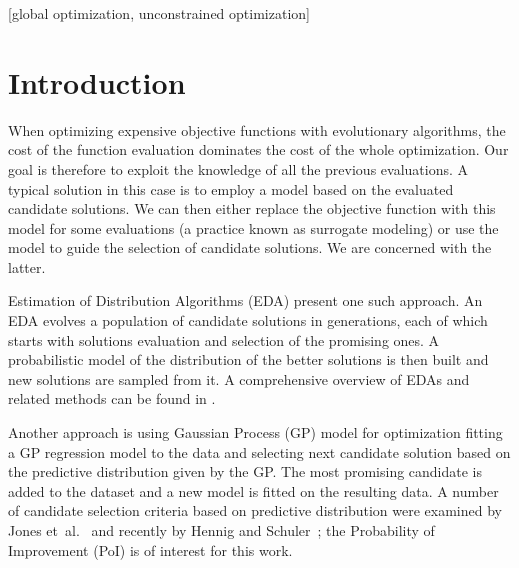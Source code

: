 \documentclass{sig-alternate}
\begin{document}
\maketitle
\begin{abstract}
Model Guided Sampling Optimization (MGSO) is a novel expensive black-box
optimization method based on a combination of ideas from Estimation of 
Distribution Algorithms and global optimization methods using Gaussian 
Processes. The algorithm is described and its implementation tested on 
three benchmark functions as a proof of concept.
\end{abstract}

[global optimization,
unconstrained optimization]


\section{Introduction}

When optimizing expensive objective functions with evolutionary algorithms, the cost of the function 
evaluation dominates the cost of the whole optimization. Our goal is therefore to exploit the knowledge 
of all the previous evaluations. A typical solution in this case is to employ a model based on the evaluated 
candidate solutions. We can then either replace the objective function  with this model for some 
evaluations (a practice known as surrogate modeling) or use the model to guide the selection of candidate 
solutions. We are concerned with the latter.

Estimation of Distribution Algorithms (EDA) present one such approach. An EDA evolves a population of 
candidate solutions in generations, each of which starts with solutions evaluation and selection of the
promising ones. A probabilistic model of the distribution of the better solutions is then built and new 
solutions are sampled from it. A comprehensive overview of EDAs and related methods can be found in \cite{pelikan2006scalable}.

Another approach is using Gaussian Process (GP) model for optimization fitting a GP regression model to the 
data and selecting next candidate solution based on the predictive distribution given by the GP. The most 
promising candidate is added to the dataset and a new model is fitted on the resulting data. A number of candidate 
selection criteria based on predictive distribution were examined by Jones et~al.~\cite{jones01taxonomy} 
and recently by Hennig and Schuler~\cite{hennig12entropy}; the Probability of Improvement (PoI) is of interest for this work.
\end{document}
